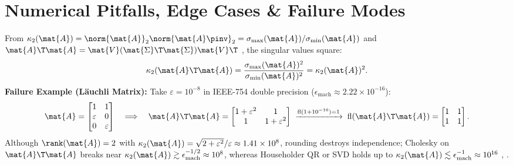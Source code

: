 \documentclass[../../../../master.tex]{subfiles}
\begin{document}
\section{Numerical Pitfalls, Edge Cases \& Failure Modes}
\label{sec:vecnorm:pitfalls}

\begin{pitfall}[Normal Equations Square the Condition Number: $\kappa_2(\mat{A}\T\mat{A}) = \kappa_2(\mat{A})^2$]
From $\kappa_2(\mat{A}) = \norm{\mat{A}}_2 \norm{\mat{A}\pinv}_2 = \sigma_{\max}(\mat{A}) / \sigma_{\min}(\mat{A})$ and $\mat{A}\T\mat{A} = \mat{V}(\mat{\Sigma}\T\mat{\Sigma})\mat{V}\T$ , the singular values square:
\begin{equation}
  \kappa_2(\mat{A}\T\mat{A}) = \frac{\sigma_{\max}(\mat{A})^2}{\sigma_{\min}(\mat{A})^2} = \kappa_2(\mat{A})^2.
  \label{eq:vecnorm:kappa_sq}
\end{equation}
\textbf{Failure Example (L\"auchli Matrix):} Take $\varepsilon = 10^{-8}$ in IEEE-754 double precision ($\epsilon_{\mathrm{mach}} \approx 2.22 \times 10^{-16}$):
\[
  \mat{A} = \begin{bmatrix} 1 & 1 \\ \varepsilon & 0 \\ 0 & \varepsilon \end{bmatrix}
  \quad\Longrightarrow\quad
  \mat{A}\T\mat{A} = \begin{bmatrix} 1 + \varepsilon^2 & 1 \\ 1 & 1 + \varepsilon^2 \end{bmatrix}
  \;\xrightarrow{\mathrm{fl}(1 + 10^{-16}) = 1}\;
  \mathrm{fl}(\mat{A}\T\mat{A}) = \begin{bmatrix} 1 & 1 \\ 1 & 1 \end{bmatrix}.
\]
Although $\rank(\mat{A}) = 2$ with $\kappa_2(\mat{A}) = \sqrt{2 + \varepsilon^2}/\varepsilon \approx 1.41 \times 10^8$, rounding destroys independence; Cholesky on $\mat{A}\T\mat{A}$ breaks near $\kappa_2(\mat{A}) \gtrsim \epsilon_{\mathrm{mach}}^{-1/2} \approx 10^8$, whereas Householder QR or SVD holds up to $\kappa_2(\mat{A}) \lesssim \epsilon_{\mathrm{mach}}^{-1} \approx 10^{16}$ , .
\end{pitfall}
\end{document}
